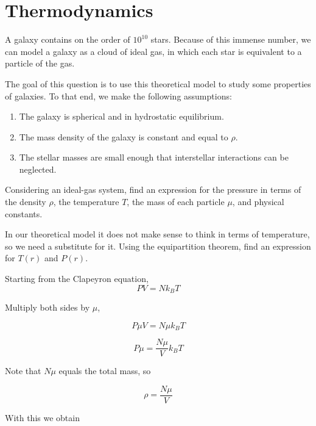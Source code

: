 \documentclass[11pt]{article}
\begin{document}
\section{Thermodynamics}
\begin{pproblem}
    A galaxy contains on the order of \(10^{10}\) stars. Because of this immense number, we can model a galaxy as a cloud of ideal gas, in which each star is equivalent to a particle of the gas.
    
    The goal of this question is to use this theoretical model to study some properties of galaxies. To that end, we make the following assumptions:

    \begin{enumerate}[label=\roman*)]
        \item The galaxy is spherical and in hydrostatic equilibrium.
        \item The mass density of the galaxy is constant and equal to \(\rho\).
        \item The stellar masses are small enough that interstellar interactions can be neglected.
    \end{enumerate}
    
    \begin{alternativas}
        \item Considering an ideal-gas system, find an expression for the pressure in terms of the density \(\rho\), the temperature \(T\), the mass of each particle \(\mu\), and physical constants.
        
        \item In our theoretical model it does not make sense to think in terms of temperature, so we need a substitute for it. Using the equipartition theorem, find an expression for \(T(r)\) and \(P(r)\).
    \end{alternativas}
\begin{pssolution*}{}{}
    \begin{alternativas}
        \item Starting from the Clapeyron equation,
        \[PV = Nk_BT\]

        Multiply both sides by \(\mu\),

        \[P\mu V = N\mu k_B T\]

        \[P\mu = \frac{N\mu}{V}k_BT\]

        Note that \(N\mu\) equals the total mass, so

        \[\rho = \frac{N\mu}{V}\]
        
        With this we obtain


\end{alternativas}
\end{pssolution*}
\end{pproblem}
\end{document}
